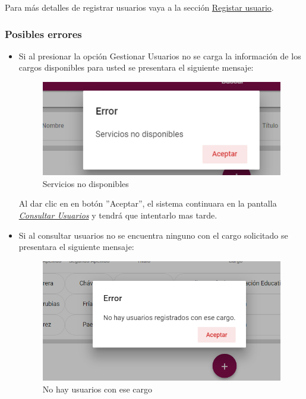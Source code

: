             Para más detalles de registrar usuarios vaya a la sección \hyperlink{registrar}{Registar usuario}.

        \subsubsection{Posibles errores}
    	  \begin{itemize}
            	\item Si al  presionar la opción Gestionar Usuarios no se carga la información de los cargos disponibles para usted se presentara el siguiente mensaje:

             \begin{figure}[H]
            	\centering
            	\includegraphics[width=0.4\linewidth]{images/SP5/MSGSN}
            	\caption{Servicios no disponibles}
            	\label{SND}

            \end{figure}

            		Al dar clic en en botón ''Aceptar'', el sistema continuara en la pantalla  \hyperlink{consultarUs}{\textit{Consultar Usuarios}} y tendrá que intentarlo  mas tarde.

           		\item Si al consultar usuarios no se encuentra ninguno con el cargo solicitado se presentara el siguiente mensaje:
           		 \begin{figure}[H]
           			\centering
           			\includegraphics[width=0.4\linewidth]{images/SP5/MSG21}
           			\caption{No hay usuarios con ese cargo}
           			\label{mensaje21}
           		\end{figure}

           \end{itemize}



